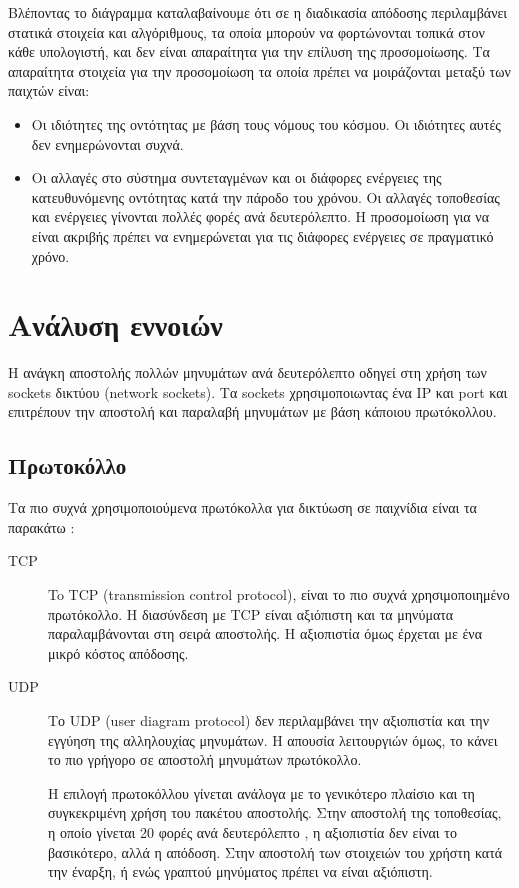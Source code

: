 		Βλέποντας το διάγραμμα καταλαβαίνουμε ότι σε η διαδικασία απόδοσης περιλαμβάνει στατικά στοιχεία και αλγόριθμους, τα οποία μπορούν να φορτώνονται τοπικά στον κάθε υπολογιστή, και δεν είναι απαραίτητα για την επίλυση της προσομοίωσης. Τα απαραίτητα στοιχεία για την προσομοίωση τα οποία πρέπει να μοιράζονται μεταξύ των παιχτών είναι:
		\begin{itemize}
			\item Oι ιδιότητες της οντότητας με βάση τους νόμους του κόσμου. Οι ιδιότητες αυτές δεν ενημερώνονται συχνά.
			\item Οι αλλαγές στο σύστημα συντεταγμένων και οι διάφορες ενέργειες της κατευθυνόμενης οντότητας κατά την πάροδο του χρόνου. Οι αλλαγές τοποθεσίας και ενέργειες γίνονται πολλές φορές ανά δευτερόλεπτο. Η προσομοίωση για να είναι ακριβής πρέπει να ενημερώνεται για τις διάφορες ενέργειες σε πραγματικό χρόνο.
		\end{itemize}
				
		\section{Ανάλυση εννοιών}	
		Η ανάγκη αποστολής πολλών μηνυμάτων ανά δευτερόλεπτο οδηγεί στη χρήση των sockets δικτύου (network sockets). Τα sockets χρησιμοποιωντας ένα \gls{IP} και \gls{port} και επιτρέπουν την αποστολή και παραλαβή μηνυμάτων με βάση κάποιου πρωτόκολλου.
		
		\subsection{Πρωτοκόλλο}
		Τα πιο συχνά χρησιμοποιούμενα πρωτόκολλα για δικτύωση σε παιχνίδια είναι τα παρακάτω \cite{sanja14}:
		\begin{description}	
			\item [TCP] To TCP (transmission control protocol), είναι το πιο συχνά χρησιμοποιημένο πρωτόκολλο. Η διασύνδεση με TCP είναι αξιόπιστη και τα μηνύματα παραλαμβάνονται στη σειρά αποστολής. Η αξιοπιστία όμως έρχεται με ένα μικρό κόστος απόδοσης.
			\item [UDP] Το UDP (user diagram protocol) δεν περιλαμβάνει την αξιοπιστία και την εγγύηση της αλληλουχίας μηνυμάτων. Η απουσία λειτουργιών όμως, το κάνει το πιο γρήγορο σε αποστολή μηνυμάτων πρωτόκολλο.
			
			Η επιλογή πρωτοκόλλου γίνεται ανάλογα με το γενικότερο πλαίσιο και τη συγκεκριμένη χρήση του πακέτου αποστολής. Στην αποστολή της τοποθεσίας, η οποίο γίνεται 20 φορές ανά δευτερόλεπτο \cite{networkthomson}, η αξιοπιστία δεν είναι το βασικότερο, αλλά η απόδοση. Στην αποστολή των στοιχειών του χρήστη κατά την έναρξη, ή ενώς γραπτού μηνύματος πρέπει να είναι αξιόπιστη.
		\end{description}

